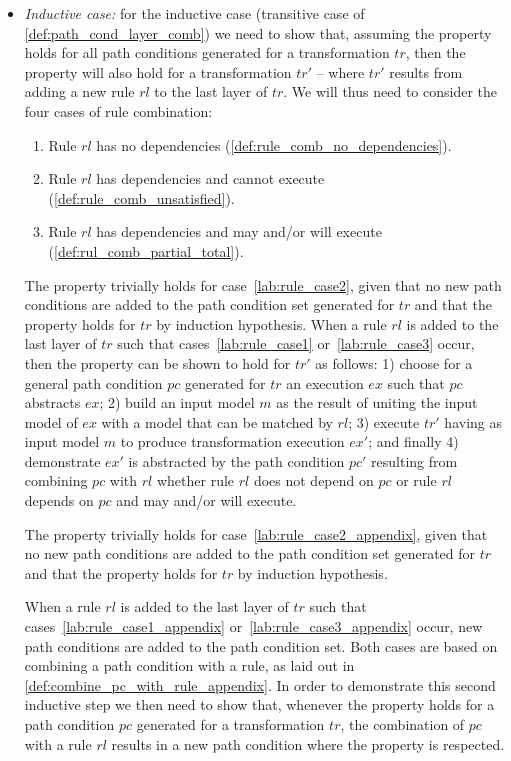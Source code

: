 \begin{ps}
\begin{itemize}
  \item \emph{Inductive case:} for the inductive case (transitive case of \cref{def:path_cond_layer_comb}) we need to show that, assuming the property holds for all path conditions generated for a transformation $tr$, then the property will also hold for a transformation $tr'$ -- where $tr'$ results from adding a new rule $rl$ to the last layer of $tr$. We will thus need to consider the four  cases of rule combination:\vspace{.2cm} 
 
\begin{enumerate}
\item\label{lab:rule_case1} Rule $rl$ has no dependencies (\cref{def:rule_comb_no_dependencies}).
\item\label{lab:rule_case2} Rule $rl$ has dependencies and cannot execute (\cref{def:rule_comb_unsatisfied}).
\item\label{lab:rule_case3} Rule $rl$ has dependencies and may and/or will execute (\cref{def:rul_comb_partial_total}).
\end{enumerate}

The property trivially holds for case~\ref{lab:rule_case2}, given that no new path conditions are added to the path condition set generated for $tr$ and that the property holds for $tr$ by induction hypothesis. When a rule $rl$ is added to the last layer of $tr$ such that cases~\ref{lab:rule_case1} or~\ref{lab:rule_case3} occur, then the property can be shown to hold for $tr'$ as follows: 1) choose for a general path condition $pc$ generated for $tr$ an execution $ex$ such that $pc$ abstracts $ex$; 2) build an input model $m$ as the result of uniting the input model of $ex$ with a model that can be matched by $rl$; 3) execute $tr'$ having as input model $m$ to produce transformation execution $ex'$; and finally 4) demonstrate $ex'$ is abstracted by the path condition $pc'$ resulting from combining $pc$ with $rl$ whether rule $rl$ does not depend on $pc$ or rule $rl$ depends on $pc$ and may and/or will execute.

The property trivially holds for case~\ref{lab:rule_case2_appendix}, given that no new path conditions are added to the path condition set generated for $tr$ and that the property holds for $tr$ by induction hypothesis.

When a rule $rl$ is added to the last layer of $tr$ such that cases~\ref{lab:rule_case1_appendix} or~\ref{lab:rule_case3_appendix} occur, new path conditions are added to the path condition set. Both cases are based on combining a path condition with a rule, as laid out in \cref{def:combine_pc_with_rule_appendix}. In order to demonstrate this second inductive step we then need to show that, whenever the property holds for a path condition $pc$ generated for a transformation $tr$, the combination of $pc$ with a rule $rl$ results in a new path condition where the property is respected.


\end{itemize}
\end{ps}
